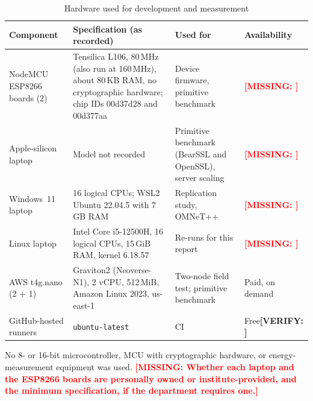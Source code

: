 \documentclass[12pt,a4paper,oneside]{report}
\numberwithin{equation}{chapter}
\newcommand{\MISSING}[1]{\textcolor{red}{\textbf{[MISSING: #1]}}}
\newcommand{\VERIFY}[1]{\textcolor{orange!85!black}{\textbf{[VERIFY: #1]}}}
\begin{document}
\begin{table}[H]
\centering
\caption{Hardware used for development and measurement}
\label{tab:hw}
\small
\begin{tabularx}{\textwidth}{|P{0.19\textwidth}|Y|P{0.18\textwidth}|P{0.17\textwidth}|}
\hline
\textbf{Component} & \textbf{Specification (as recorded)} & \textbf{Used for} & \textbf{Availability}\\ \hline
NodeMCU ESP8266 boards (2) & Tensilica L106, 80\,MHz (also run at 160\,MHz), about 80\,KB RAM, no cryptographic hardware; chip IDs 00d37d28 and 00d377aa & Device firmware, primitive benchmark & \MISSING{}\\ \hline
Apple-silicon laptop & Model not recorded & Primitive benchmark (BearSSL and OpenSSL), server scaling & \MISSING{}\\ \hline
Windows~11 laptop & 16 logical CPUs; WSL2 Ubuntu 22.04.5 with 7\,GB RAM & Replication study, OMNeT++ & \MISSING{}\\ \hline
Linux laptop & Intel Core i5-12500H, 16 logical CPUs, 15\,GiB RAM, kernel 6.18.57 & Re-runs for this report & \MISSING{}\\ \hline
AWS t4g.nano (2 + 1) & Graviton2 (Neoverse-N1), 2 vCPU, 512\,MiB, Amazon Linux 2023, us-east-1 & Two-node field test; primitive benchmark & Paid, on demand\\ \hline
GitHub-hosted runners & \texttt{ubuntu-latest} & CI & Free\VERIFY{}\\ \hline
\end{tabularx}
\end{table}

\noindent No 8- or 16-bit microcontroller, MCU with cryptographic hardware, or energy-measurement equipment was used. \MISSING{Whether each laptop and the ESP8266 boards are personally owned or institute-provided, and the minimum specification, if the department requires one.}
\end{document}
